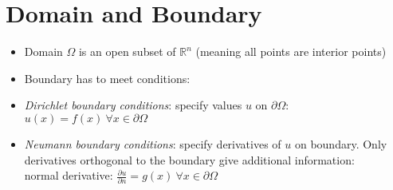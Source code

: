 \section{Domain and Boundary}
\begin{itemize}
    \item Domain $\Omega$ is an open subset of $\mathbb{R}^n$ (meaning all points are interior points)
    \item Boundary has to meet conditions:
    \item{ \emph{Dirichlet boundary conditions}: specify values $u$ on $\partial\Omega$: \\
        $u(x) = f(x)\ \forall x\in\partial\Omega$
    }
    \item{\emph{Neumann boundary conditions}: specify derivatives of $u$ on boundary.
    Only derivatives orthogonal to the boundary give additional information: \\
    normal derivative: $\frac{\partial u}{\partial n} = g(x)\ \forall x\in\partial\Omega$
    }
\end{itemize}
